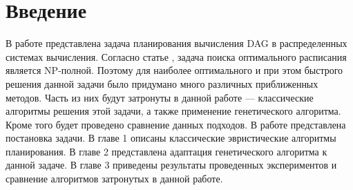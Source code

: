 \chapter*{Введение}




\begin{spacing}{1.3}
В работе представлена задача планирования вычисления DAG в распределенных системах вычисления. Согласно статье \cite{NPCOMP}, задача поиска оптимального расписания является NP-полной. Поэтому для наиболее оптимального и при этом быстрого решения данной задачи было придумано много различных приближенных методов. Часть из них будут затронуты в данной работе --- классические алгоритмы решения этой задачи, а также применение генетического алгоритма. Кроме того будет проведено сравнение данных подходов. В работе представлена постановка задачи. В главе 1 описаны классические эвристические алгоритмы планирования. В главе 2 представлена адаптация генетического алгоритма к данной задаче. В главе 3 приведены результаты проведенных экспериментов и сравнение алгоритмов затронутых в данной работе.
 
\end{spacing}


